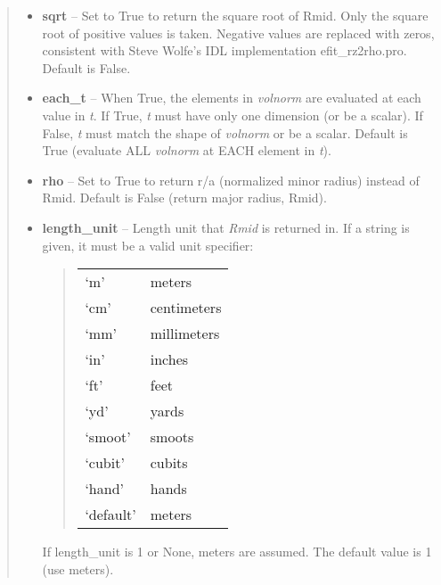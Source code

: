 \documentclass[letterpaper,10pt,english]{sphinxmanual}
\begin{document}
\begin{fulllineitems}
\begin{fulllineitems}
\begin{quote}
\begin{description}
\begin{itemize}
\item {} 
\textbf{sqrt} -- Set to True to return the square root of Rmid.
Only the square root of positive values is taken. Negative
values are replaced with zeros, consistent with Steve Wolfe's
IDL implementation efit\_rz2rho.pro. Default is False.

\item {} 
\textbf{each\_t} -- When True, the elements in \emph{volnorm} are evaluated
at each value in \emph{t}. If True, \emph{t} must have only one dimension
(or be a scalar). If False, \emph{t} must match the shape of \emph{volnorm}
or be a scalar. Default is True (evaluate ALL \emph{volnorm} at EACH
element in \emph{t}).

\item {} 
\textbf{rho} -- Set to True to return r/a (normalized minor radius)
instead of Rmid. Default is False (return major radius, Rmid).

\item {} 
\textbf{length\_unit} -- 
Length unit that \emph{Rmid} is returned in.
If a string is given, it must be a valid unit specifier:
\begin{quote}

\begin{tabulary}{\linewidth}{|L|L|}
\hline

`m'
 & 
meters
\\

`cm'
 & 
centimeters
\\

`mm'
 & 
millimeters
\\

`in'
 & 
inches
\\

`ft'
 & 
feet
\\

`yd'
 & 
yards
\\

`smoot'
 & 
smoots
\\

`cubit'
 & 
cubits
\\

`hand'
 & 
hands
\\

`default'
 & 
meters
\\
\hline\end{tabulary}

\end{quote}

If length\_unit is 1 or None, meters are assumed. The default
value is 1 (use meters).



\end{itemize}
\end{description}
\end{quote}
\end{fulllineitems}
\end{fulllineitems}
\end{document}
